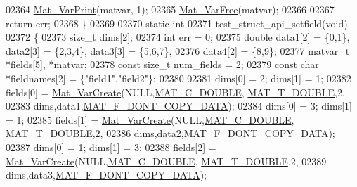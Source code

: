 \begin{DoxyCode}
{{{{{02364     \hyperlink{group___m_a_t_ga9100c145e338b84b55d5d0795d5d390a}{Mat\_VarPrint}(matvar, 1);
02365     \hyperlink{group___m_a_t_ga1d14716f7450530fd1c9d02413787f0e}{Mat\_VarFree}(matvar);
02366 
02367     \textcolor{keywordflow}{return} err;
02368 \}
02369 
02370 \textcolor{keyword}{static} \textcolor{keywordtype}{int}
02371 test\_struct\_api\_setfield(\textcolor{keywordtype}{void})
02372 \{
02373     \textcolor{keywordtype}{size\_t} dims[2];
02374     \textcolor{keywordtype}{int}    err = 0;
02375     \textcolor{keywordtype}{double}    data1[2] = \{0,1\}, data2[3] = \{2,3,4\}, data3[3] = \{5,6,7\},
02376               data4[2] = \{8,9\};
02377     \hyperlink{group___m_a_t_structmatvar__t}{matvar\_t} *fields[5], *matvar;
02378     \textcolor{keyword}{const} \textcolor{keywordtype}{size\_t} num\_fields = 2;
02379     \textcolor{keyword}{const} \textcolor{keywordtype}{char} *fieldnames[2] = \{\textcolor{stringliteral}{"field1"},\textcolor{stringliteral}{"field2"}\};
02380 
02381     dims[0] = 2; dims[1] = 1;
02382     fields[0] = \hyperlink{group___m_a_t_ga1c54a84bb4d810c6fccdb8869489eac4}{Mat\_VarCreate}(NULL,\hyperlink{group___m_a_t_ggad4d60ae7b709fc81bfd744fb4c857c40a5d70e0862e5bdb7bd86bf7ba5948f307}{MAT\_C\_DOUBLE},
      \hyperlink{group___m_a_t_ggacf7b3b879282b7ab3a51190e49bf3453a31e721ecf7e188196f83c32838288797}{MAT\_T\_DOUBLE},2,
02383                               dims,data1,\hyperlink{group___m_a_t_ggab9d6ef9e3ddca78a317b173f01d53fbba762244499f52eb35e7b53fb79a1f2889}{MAT\_F\_DONT\_COPY\_DATA});
02384     dims[0] = 3; dims[1] = 1;
02385     fields[1] = \hyperlink{group___m_a_t_ga1c54a84bb4d810c6fccdb8869489eac4}{Mat\_VarCreate}(NULL,\hyperlink{group___m_a_t_ggad4d60ae7b709fc81bfd744fb4c857c40a5d70e0862e5bdb7bd86bf7ba5948f307}{MAT\_C\_DOUBLE},
      \hyperlink{group___m_a_t_ggacf7b3b879282b7ab3a51190e49bf3453a31e721ecf7e188196f83c32838288797}{MAT\_T\_DOUBLE},2,
02386                               dims,data2,\hyperlink{group___m_a_t_ggab9d6ef9e3ddca78a317b173f01d53fbba762244499f52eb35e7b53fb79a1f2889}{MAT\_F\_DONT\_COPY\_DATA});
02387     dims[0] = 1; dims[1] = 3;
02388     fields[2] = \hyperlink{group___m_a_t_ga1c54a84bb4d810c6fccdb8869489eac4}{Mat\_VarCreate}(NULL,\hyperlink{group___m_a_t_ggad4d60ae7b709fc81bfd744fb4c857c40a5d70e0862e5bdb7bd86bf7ba5948f307}{MAT\_C\_DOUBLE},
      \hyperlink{group___m_a_t_ggacf7b3b879282b7ab3a51190e49bf3453a31e721ecf7e188196f83c32838288797}{MAT\_T\_DOUBLE},2,
02389                               dims,data3,\hyperlink{group___m_a_t_ggab9d6ef9e3ddca78a317b173f01d53fbba762244499f52eb35e7b53fb79a1f2889}{MAT\_F\_DONT\_COPY\_DATA});
}}}}}
\end{DoxyCode}

